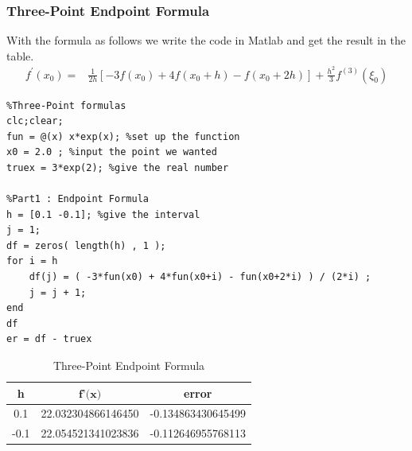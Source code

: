 \documentclass{article}
\begin{document}
\subsubsection{Three-Point Endpoint Formula}
With the formula as follows we write the code in Matlab and get the result in the table.
\begin{align}
    f^{\prime}\left(x_{0}\right)=&\frac{1}{2 h}\left[-3 f\left(x_{0}\right)+4 f\left(x_{0}+h\right)-f\left(x_{0}+2 h\right)\right]+\frac{h^{2}}{3} f^{(3)}\left(\xi_{0}\right)\nonumber 
\end{align}
\begin{lstlisting}
%Three-Point formulas
clc;clear;
fun = @(x) x*exp(x); %set up the function
x0 = 2.0 ; %input the point we wanted
truex = 3*exp(2); %give the real number

%Part1 : Endpoint Formula
h = [0.1 -0.1]; %give the interval
j = 1;
df = zeros( length(h) , 1 );
for i = h
    df(j) = ( -3*fun(x0) + 4*fun(x0+i) - fun(x0+2*i) ) / (2*i) ; 
    j = j + 1;
end
df
er = df - truex
\end{lstlisting}
\begin{table}[!ht]
    \centering
    \begin{tabular}{|c|c|c|}
    \hline
        \textbf{h} & $\textbf{f'(x)}$ & \textbf{error} \\ \hline
        0.1 &   22.032304866146450  &   -0.134863430645499  \\ \hline
        -0.1 &   22.054521341023836  &   -0.112646955768113  \\ \hline
    \end{tabular}
    \caption{Three-Point Endpoint Formula}
    \label{3PE}
\end{table}
\end{document}
